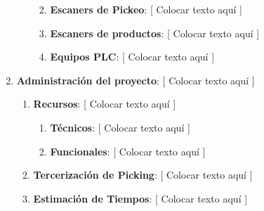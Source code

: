 \documentclass{article}
\begin{document}
\begin{enumerate}
\begin{enumerate}[label*=\arabic*.]
					\begin{enumerate}[label*=\arabic*.]
						\itemsep=3pt \topsep=0pt \partopsep=0pt \parskip=0pt \parsep=0pt

						\item \textbf{Escaners de Pickeo}: [ Colocar texto aquí ]

						\item \textbf{Escaners de productos}: [ Colocar texto aquí ]

						\item \textbf{Equipos PLC}: [ Colocar texto aquí ]

					\end{enumerate}

			\end{enumerate}

		\item \textbf{Administración del proyecto}: [ Colocar texto aquí ]

			\begin{enumerate}[label*=\arabic*.]

				\item \textbf{Recursos}: [ Colocar texto aquí ]

					\begin{enumerate}[label*=\arabic*.]
						\itemsep=3pt \topsep=0pt \partopsep=0pt \parskip=0pt \parsep=0pt

						\item \textbf{Técnicos}: [ Colocar texto aquí ]

						\item \textbf{Funcionales}: [ Colocar texto aquí ]

					\end{enumerate}
			
				\item \textbf{Tercerización de Picking}: [ Colocar texto aquí ]

				\item \textbf{Estimación de Tiempos}: [ Colocar texto aquí ]

			\end{enumerate}

	\end{enumerate}
	\medskip

\bigskip



\end{document}
